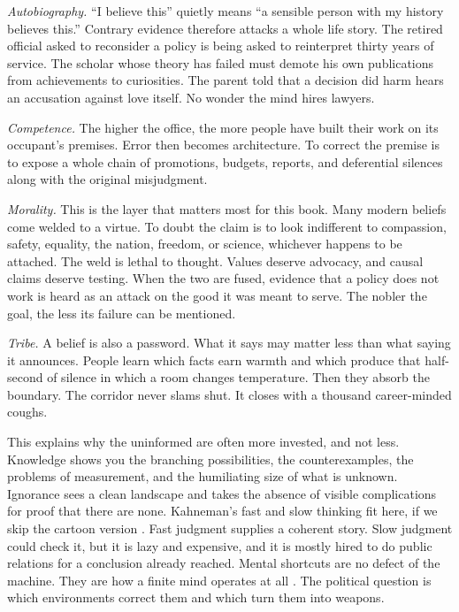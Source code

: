 \documentclass[12pt,a4paper]{book}
\begin{document}
\emph{Autobiography.} ``I believe this'' quietly means ``a sensible person with my history believes this.'' Contrary evidence therefore attacks a whole life story. The retired official asked to reconsider a policy is being asked to reinterpret thirty years of service. The scholar whose theory has failed must demote his own publications from achievements to curiosities. The parent told that a decision did harm hears an accusation against love itself. No wonder the mind hires lawyers.

\emph{Competence.} The higher the office, the more people have built their work on its occupant's premises. Error then becomes architecture. To correct the premise is to expose a whole chain of promotions, budgets, reports, and deferential silences along with the original misjudgment.

\emph{Morality.} This is the layer that matters most for this book. Many modern beliefs come welded to a virtue. To doubt the claim is to look indifferent to compassion, safety, equality, the nation, freedom, or science, whichever happens to be attached. The weld is lethal to thought. Values deserve advocacy, and causal claims deserve testing. When the two are fused, evidence that a policy does not work is heard as an attack on the good it was meant to serve. The nobler the goal, the less its failure can be mentioned.

\emph{Tribe.} A belief is also a password. What it says may matter less than what saying it announces. People learn which facts earn warmth and which produce that half-second of silence in which a room changes temperature. Then they absorb the boundary. The corridor never slams shut. It closes with a thousand career-minded coughs.

This explains why the uninformed are often more invested, and not less. Knowledge shows you the branching possibilities, the counterexamples, the problems of measurement, and the humiliating size of what is unknown. Ignorance sees a clean landscape and takes the absence of visible complications for proof that there are none. Kahneman's fast and slow thinking fit here, if we skip the cartoon version \cite{kahneman2011thinking}. Fast judgment supplies a coherent story. Slow judgment could check it, but it is lazy and expensive, and it is mostly hired to do public relations for a conclusion already reached. Mental shortcuts are no defect of the machine. They are how a finite mind operates at all \cite{Tversky1974}. The political question is which environments correct them and which turn them into weapons.
\end{document}
